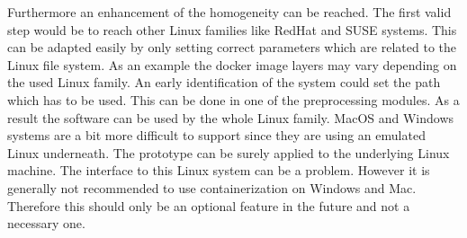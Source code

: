 Furthermore an enhancement of the homogeneity can be reached.
The first valid step would be to reach other Linux families like RedHat and SUSE systems.
This can be adapted easily by only setting correct parameters which are related to the Linux file system.
As an example the docker image layers may vary depending on the used Linux family.
An early identification of the system could set the path which has to be used.
This can be done in one of the preprocessing modules.
As a result the software can be used by the whole Linux family.
MacOS and Windows systems are a bit more difficult to support since they are using an emulated Linux underneath.
The prototype can be surely applied to the underlying Linux machine.
The interface to this Linux system can be a problem. 
However it is generally not recommended to use containerization on Windows and Mac. 
Therefore this should only be an optional feature in the future and not a necessary one.




